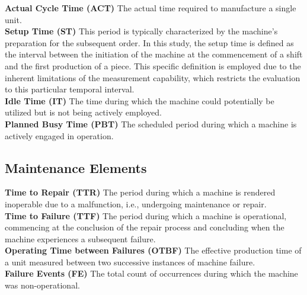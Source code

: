 {\textbf{Actual Cycle Time (ACT)}
The actual time required to manufacture a single unit.\\
\textbf{Setup Time (ST)}
This period is typically characterized by the machine's preparation for the subsequent order. In this study, the setup time is defined as the interval between the initiation of the machine at the commencement of a shift and the first production of a piece. This specific definition is employed due to the inherent limitations of the measurement capability, which restricts the evaluation to this particular temporal interval.\\
\textbf{Idle Time (IT)}
The time during which the machine could potentially be utilized but is not being actively employed.\\
\textbf{Planned Busy Time (PBT)}
The scheduled period during which a machine is actively engaged in operation.

\subsection{Maintenance Elements}
\textbf{Time to Repair (TTR)}
The period during which a machine is rendered inoperable due to a malfunction, i.e., undergoing maintenance or repair.\\
\textbf{Time to Failure (TTF)}
The period during which a machine is operational, commencing at the conclusion of the repair process and concluding when the machine experiences a subsequent failure.\\
\textbf{Operating Time between Failures (OTBF)}
The effective production time of a unit measured between two successive instances of machine failure.\\
\textbf{Failure Events (FE)}
The total count of occurrences during which the machine was non-operational.

}
